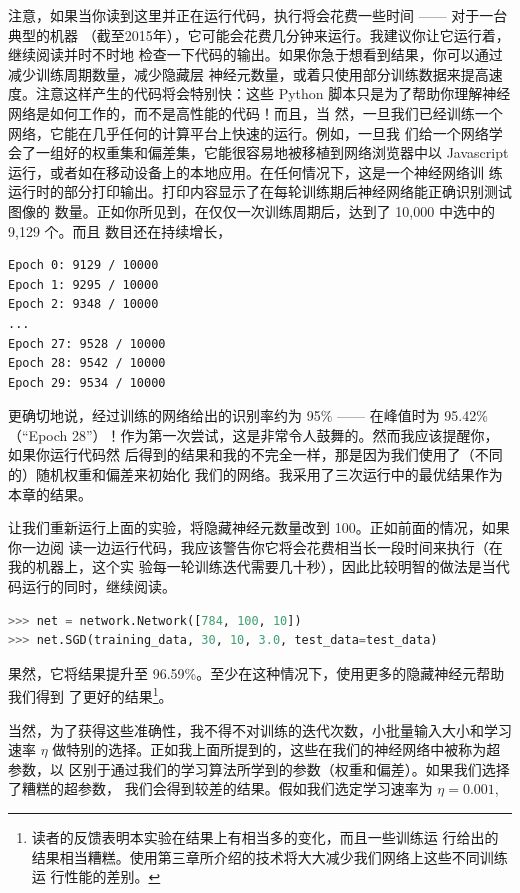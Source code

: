 注意，如果当你读到这里并正在运行代码，执行将会花费一些时间 —— 对于一台典型的机器
（截至2015年），它可能会花费几分钟来运行。我建议你让它运行着，继续阅读并时不时地
检查一下代码的输出。如果你急于想看到结果，你可以通过减少训练周期数量，减少隐藏层
神经元数量，或着只使用部分训练数据来提高速度。注意这样产生的代码将会特别快：这些
Python 脚本只是为了帮助你理解神经网络是如何工作的，而不是高性能的代码！而且，当
然，一旦我们已经训练一个网络，它能在几乎任何的计算平台上快速的运行。例如，一旦我
们给一个网络学会了一组好的权重集和偏差集，它能很容易地被移植到网络浏览器中以
Javascript 运行，或者如在移动设备上的本地应用。在任何情况下，这是一个神经网络训
练运行时的部分打印输出。打印内容显示了在每轮训练期后神经网络能正确识别测试图像的
数量。正如你所见到，在仅仅一次训练周期后，达到了 10,000 中选中的 9,129 个。而且
数目还在持续增长，

\begin{lstlisting}[language=sh]
Epoch 0: 9129 / 10000
Epoch 1: 9295 / 10000
Epoch 2: 9348 / 10000
...
Epoch 27: 9528 / 10000
Epoch 28: 9542 / 10000
Epoch 29: 9534 / 10000
\end{lstlisting}

更确切地说，经过训练的网络给出的识别率约为 95\% —— 在峰值时为 95.42\%（``Epoch
  28''）！作为第一次尝试，这是非常令人鼓舞的。然而我应该提醒你，如果你运行代码然
后得到的结果和我的不完全一样，那是因为我们使用了（不同的）随机权重和偏差来初始化
我们的网络。我采用了三次运行中的最优结果作为本章的结果。

让我们重新运行上面的实验，将隐藏神经元数量改到 100。正如前面的情况，如果你一边阅
读一边运行代码，我应该警告你它将会花费相当长一段时间来执行（在我的机器上，这个实
  验每一轮训练迭代需要几十秒），因此比较明智的做法是当代码运行的同时，继续阅读。

\begin{lstlisting}[language=Python]
>>> net = network.Network([784, 100, 10])
>>> net.SGD(training_data, 30, 10, 3.0, test_data=test_data)
\end{lstlisting}

果然，它将结果提升至 96.59\%。至少在这种情况下，使用更多的隐藏神经元帮助我们得到
了更好的结果\footnote{读者的反馈表明本实验在结果上有相当多的变化，而且一些训练运
  行给出的结果相当糟糕。使用第三章所介绍的技术将大大减少我们网络上这些不同训练运
  行性能的差别。}。

当然，为了获得这些准确性，我不得不对训练的迭代次数，小批量输入大小和学习速率
$\eta$ 做特别的选择。正如我上面所提到的，这些在我们的神经网络中被称为超参数，以
区别于通过我们的学习算法所学到的参数（权重和偏差）。如果我们选择了糟糕的超参数，
我们会得到较差的结果。假如我们选定学习速率为 $\eta = 0.001$,

